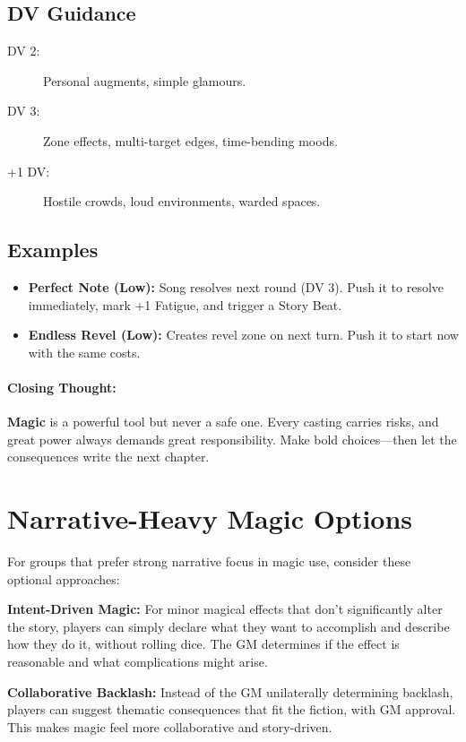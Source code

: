 \subsection*{DV Guidance}
\label{talent:cantors-path-dv}
\begin{description}
\item[DV 2:] Personal augments, simple glamours.
\item[DV 3:] Zone effects, multi-target edges, time-bending moods.
\item[+1 DV:] Hostile crowds, loud environments, warded spaces.
\end{description}

\subsection*{Examples}
\begin{itemize}
\item \textbf{Perfect Note (Low):} Song resolves next round (DV 3). Push it to resolve immediately, mark +1 Fatigue, and trigger a Story Beat.
\item \textbf{Endless Revel (Low):} Creates revel zone on next turn. Push it to start now with the same costs.
\end{itemize}

\paragraph{Closing Thought:}
\textbf{Magic} is a powerful tool but never a safe one. Every casting carries risks, and great power always demands great responsibility. Make bold choices—then let the consequences write the next chapter.

\section{Narrative-Heavy Magic Options}

For groups that prefer strong narrative focus in magic use, consider these optional approaches:

\textbf{Intent-Driven Magic:} For minor magical effects that don't significantly alter the story, players can simply declare what they want to accomplish and describe how they do it, without rolling dice. The GM determines if the effect is reasonable and what complications might arise.

\textbf{Collaborative Backlash:} Instead of the GM unilaterally determining backlash, players can suggest thematic consequences that fit the fiction, with GM approval. This makes magic feel more collaborative and story-driven.

